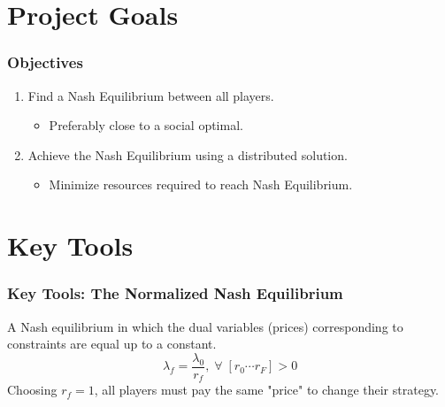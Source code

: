 \documentclass[10pt,tgadventor, onlymath]{beamer}
\begin{document}
\section{Project Goals}

\begin{frame}
\frametitle{Objectives}
\begin{enumerate}
\item Find a Nash Equilibrium between all players.
\begin{itemize}
\item Preferably close to a social optimal.
\end{itemize}
\item Achieve the Nash Equilibrium using a distributed solution.
\begin{itemize}
\item Minimize resources required to reach Nash Equilibrium.
\end{itemize}
\end{enumerate}
\pause
\begin{center}
\end{center}
\end{frame}

\section{Key Tools}

\begin{frame}
\frametitle{Key Tools: The Normalized Nash Equilibrium}
A Nash equilibrium in which the dual variables (prices) corresponding to constraints are equal up to a constant.
\begin{equation}
\lambda_f = \frac{\lambda_{0}}{ r_f}, \; \forall \; [r_0 \cdots r_F] > 0 
\end{equation}
Choosing $r_f =1$, all players must pay the same "price" to change their strategy. 
\end{frame}
\end{document}
